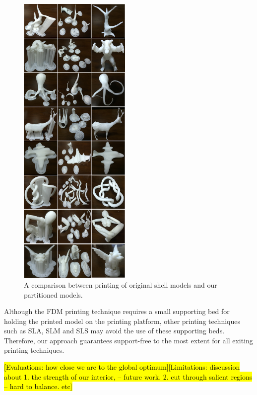 \begin{figure}[tbp]
  \centering
  \includegraphics[width=0.48\textwidth]{figs/experiment.png}
  \caption{\label{fig:experiment}%
           A comparison between printing of original shell models and our partitioned models.}
\end{figure}


Although the FDM printing technique requires a small supporting bed for holding the printed model on the printing platform, other printing techniques such as SLA, SLM and SLS may avoid the use of these supporting beds. Therefore, our approach guarantees support-free to the most extent for all exiting printing techniques.

\hl {[Evaluations: how close we are to the global optimum][Limitations: discussion about 1. the strength of our interior, -- future work. 2. cut through salient regions -- hard to balance. etc]}

